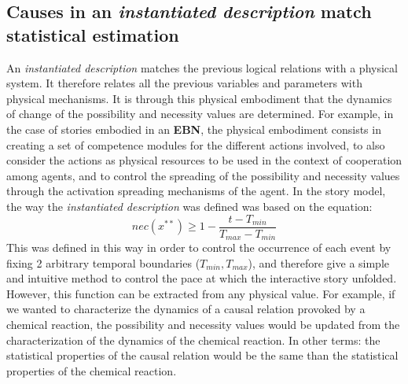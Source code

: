 \documentclass[
		twoside,openright,titlepage,numbers=noenddot,manychapters,
		headinclude,%
                footinclude=false,cleardoublepage=empty,
                BCOR=5mm,
		fontsize=11pt, %
                 enabledeprecatedfontcommands]{scrreprt}
\begin{document}



\subsection{Causes in an \emph{instantiated description} match statistical estimation}
An \emph{instantiated description} matches the previous logical relations with a physical system. It therefore relates all the previous variables and parameters with physical mechanisms. It is through this physical embodiment that the dynamics of change of the possibility and necessity values are determined. For example, in the case of stories embodied in an \textbf{EBN}, the physical embodiment consists in creating a set of competence modules for the different actions involved, to also consider the actions as physical resources to be used in the context of cooperation among agents, and to control the spreading of the possibility and necessity values through the activation spreading mechanisms of the agent. In the story model, the way the \emph{instantiated description} was defined was based on the equation:  
\begin{equation*}
nec(x^{**}) \geq 1-\frac{t-T_{min}}{T_{max}-T_{min}}
\end{equation*}
 This was defined in this way in order to  control the occurrence of each event by fixing 2 arbitrary temporal boundaries ($T_{min},T_{max}$), and therefore give a simple and intuitive method to control  the pace at which the interactive story unfolded. However, this function can be extracted from any physical value. For example, if we wanted to characterize the dynamics of a causal relation provoked by a chemical reaction, the possibility and necessity values would be updated from the characterization of the dynamics of the chemical reaction. In other terms: the statistical properties of the causal relation would be the same than the statistical properties of the chemical reaction.
\end{document}
